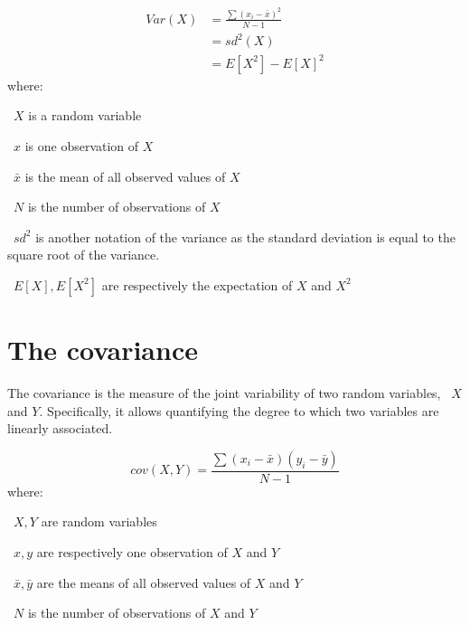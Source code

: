 \documentclass[a4paper, headinclude, footinclude, BCOR=1cm]{scrbook}
\begin{document}
\begin{equation}\label{eq:variance}
  \tag{Variance}
  \begin{split}
    Var(X) & =  \frac{\sum{(x_{i}-\bar{x})^{2}}}{N-1} \\ & = sd^{2}(X) \\
           & = E[X^2] - E[X]^2
  \end{split}
\end{equation}
where:
\quad\begin{eqlist}
    \item[\textbullet\ $X$] is a random variable
    \item[\textbullet\ $x$] is one observation of $X$
    \item[\textbullet\ $\bar{x}$] is the mean of all observed values of $X$
    \item[\textbullet\ $N$] is the number of observations of $X$
    \item[\textbullet\ $sd^2$] is another notation of the variance as
        the standard deviation is equal to the square root of the variance.
    \item[\textbullet\ ${E[X], E[X^2]}$] are respectively the expectation of $X$ and $X^2$
\end{eqlist}


\section{The covariance}

The covariance is the measure of the joint variability of two random variables,
\eg\ $X$ and $Y$.
Specifically, it allows quantifying the degree to which
two variables are linearly associated.

\begin{equation}
  \tag{Covariance}
  cov(X,Y) =  \frac{\sum{(x_{i}-\bar{x})(y_{i}-\bar{y})}}{N-1}
\end{equation}
where:
\quad\begin{eqlist}
    \item[\textbullet\ $X,Y$] are random variables
    \item[\textbullet\ $x,y$] are respectively one observation of $X$ and $Y$
    \item[\textbullet\ $\bar{x},\bar{y}$] are the means
        of all observed values of $X$ and $Y$
    \item[\textbullet\ $N$] is the number of observations of $X$ and $Y$
\end{eqlist}
\end{document}
